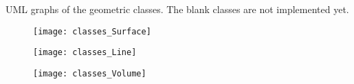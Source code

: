 UML graphs of the geometric classes. The blank classes are not implemented yet.

\begin{figure}[h]
    \centering
    \texttt{[image: classes\_Surface]}
\end{figure}

\begin{figure}[h]
    \centering
    \texttt{[image: classes\_Line]}
\end{figure}

\begin{figure}[h]
    \centering
    \texttt{[image: classes\_Volume]}
\end{figure}
